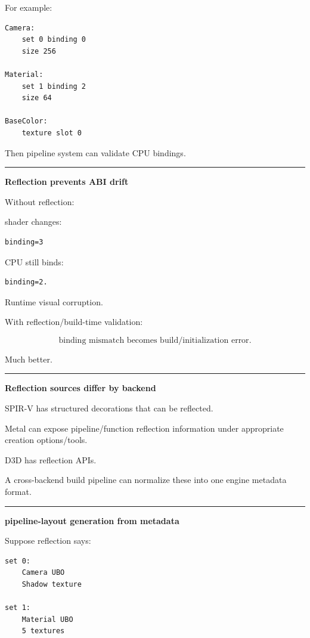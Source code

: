 For example:

\begin{verbatim}
Camera:
    set 0 binding 0
    size 256

Material:
    set 1 binding 2
    size 64

BaseColor:
    texture slot 0
\end{verbatim}

Then pipeline system can validate CPU bindings.

\begin{center}\rule{0.5\linewidth}{0.5pt}\end{center}

\textbf{Reflection prevents ABI drift}

Without reflection:

shader changes:

\begin{verbatim}
binding=3
\end{verbatim}

CPU still binds:

\begin{verbatim}
binding=2.
\end{verbatim}

Runtime visual corruption.

With reflection/build-time validation:

\[
\boxed{
\text{binding mismatch becomes build/initialization error}.
}
\]

Much better.

\begin{center}\rule{0.5\linewidth}{0.5pt}\end{center}

\textbf{Reflection sources differ by backend}

SPIR-V has structured decorations that can be reflected.

Metal can expose pipeline/function reflection information under appropriate creation options/tools.

D3D has reflection APIs.

A cross-backend build pipeline can normalize these into one engine metadata format.

\begin{center}\rule{0.5\linewidth}{0.5pt}\end{center}

\textbf{pipeline-layout generation from metadata}

Suppose reflection says:

\begin{verbatim}
set 0:
    Camera UBO
    Shadow texture

set 1:
    Material UBO
    5 textures
\end{verbatim}

